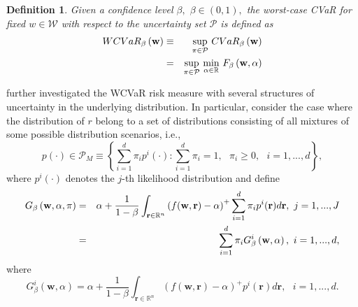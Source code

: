 \documentclass[a4paper,10pt]{article}
\newtheorem{definition}{Definition}
\begin{document}
\begin{definition}
	Given a confidence level $\beta ,$ $\beta \in (0,1),$ the worst-case CVaR
	for fixed $w\in \mathcal{W}$ with respect to the uncertainty set $\mathcal{P}
	$ is defined as
	\begin{eqnarray}
	WCVaR_{\beta }\left( \mathbf{w}\right) &\equiv &\underset{\pi \in \mathcal{P}%
	}{\sup }~ CVaR_{\beta }\left( \mathbf{w}\right)  \notag \\
	&=&\underset{\pi \in \mathcal{P}}{\sup }~\underset{\alpha \in
		\mathbb{R}
	}{\min }~F_{\beta }\left(\mathbf{w},\alpha \right)  \label{14}
	\end{eqnarray}
\end{definition}

\citet*{zhu2009worst} further investigated the WCVaR risk measure with
several structures of uncertainty in the underlying distribution. In
particular, \citet*{zhu2009worst} consider the case where the distribution
of $r$ belong to a set of distributions consisting of all mixtures of some
possible distribution scenarios, i.e.,
\begin{equation}
p\left( \cdot \right) \in \mathcal{P}_{M}\equiv \left\{ \sum_{i=1}^{d}\pi
_{i}p^{i}\left( \cdot \right) :\sum_{i=1}^{d}\pi _{i}=1,\text{ }\pi _{i}\geq
0,\text{ }i=1,...,d\right\} ,  \label{15}
\end{equation}%
where $p^{i}\left( \cdot \right) $ denotes the $j$-th likelihood
distribution and define
\begin{eqnarray}
G_{\beta }\left( \mathbf{w},\alpha ,\pi \right) &=&\alpha +\frac{1}{1-\beta }%
\int_{\mathbf{r}\in
	\mathbb{R}
	^{n}}\left( f(\mathbf{w},\mathbf{r})-\alpha \right) ^{+}\sum_{i=1}^{d}\pi
_{i}p^{i}(\mathbf{r})d\mathbf{r},\text{ }j=1,...,J  \notag \\
&=&\sum_{i=1}^{d}\pi _{i}G_{\beta }^{i}\left( \mathbf{w},\alpha \right) ,%
\text{ }i=1,...,d,  \label{16}
\end{eqnarray}%
where%
\begin{equation}
G_{\beta }^{i}\left( \mathbf{w},\alpha \right) =\alpha +\frac{1}{1-\beta }%
\int_{\mathbf{r}\in
	\mathbb{R}
	^{n}}\left( f(\mathbf{w},\mathbf{r})-\alpha \right) ^{+}p^{i}(\mathbf{r})d%
\mathbf{r},\text{ }i=1,...,d.  \label{17}
\end{equation}%
\end{document}
